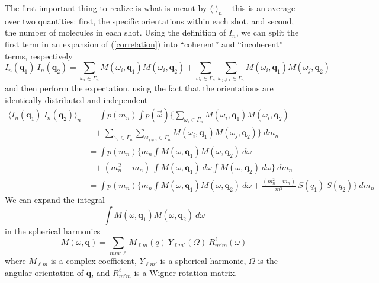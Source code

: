 \documentclass[aps,prl,preprint,groupedaddress]{revtex4-1}
\def\*#1{\mathbf{#1}}
\begin{document}
The first important thing to realize is what is meant by $\langle \cdot \rangle_n$ -- this is an average over two quantities: first, the specific orientations within each shot, and second, the number of molecules in each shot. Using the definition of $I_n$, we can split the first term in an expansion of (\ref{correlation}) into ``coherent'' and ``incoherent'' terms, respectively
\[
I_n ( \*q_1 ) \> I_n ( \*q_2 ) = \sum_{\omega_i \in \Gamma_n} M( \omega_i, \*{q}_1 ) M( \omega_i, \*{q}_2 ) 
+ \sum_{\omega_i \in \Gamma_n}\sum_{\omega_{j \neq i} \in \Gamma_n} M( \omega_i, \*{q}_1 ) M( \omega_j, \*{q}_2 ) 
\]
and then perform the expectation, using the fact that the orientations are identically distributed and independent
\begin{align*}
%
\big\langle I_n ( \*q_1 ) \> I_n ( \*q_2 ) \big\rangle_n
%
&= \int p(m_n) \int p(\vec{\omega}) 
\Big\{ \sum_{\omega_i \in \Gamma_n} M( \omega_i, \*{q}_1 ) M( \omega_i, \*{q}_2 ) \\
& \ \ \ + \sum_{\omega_i \in \Gamma_n}\sum_{\omega_{j \neq i} \in \Gamma_n} M( \omega_i, \*{q}_1 ) M( \omega_j, \*{q}_2 )  \Big\} \> dm_n \\
%
&= \int p(m_n) 
\Big\{ m_n \int M( \omega, \*{q}_1 ) M( \omega, \*{q}_2 ) \> d \omega \\
& \ \ \ +  (m_n^2 - m_n) \> \int M( \omega, \*{q}_1 ) \> d\omega \int M( \omega, \*{q}_2 ) \> d\omega  \Big\} \> dm_n \\
%
&= \int p(m_n) 
\Big\{ m_n \int M( \omega, \*{q}_1 ) M( \omega, \*{q}_2 ) \> d \omega
+  \frac{(m_n^2 - m_n)}{m^2} \> S(q_1) \> S(q_2)  \Big\} \> dm_n
%
\end{align*}
We can expand the integral
\begin{equation}\label{integral}
\int M( \omega, \*{q}_1 ) M( \omega, \*{q}_2 ) \> d \omega
\end{equation}
in the spherical harmonics
\begin{equation}\label{expansion}
M( \omega, \*{q} ) = \sum_{m m' \ell} M_{\ell m} (q) \> Y_{\ell m'} (\Omega) \> R_{m' m}^{\ell} (\omega)
\end{equation}
where $M_{\ell m}$ is a complex coefficient, $ Y_{\ell m'} $ is a spherical harmonic, $\Omega$ is the angular orientation of $\*q$, and $R_{m' m}^{\ell}$ is a Wigner rotation matrix. 
\end{document}
